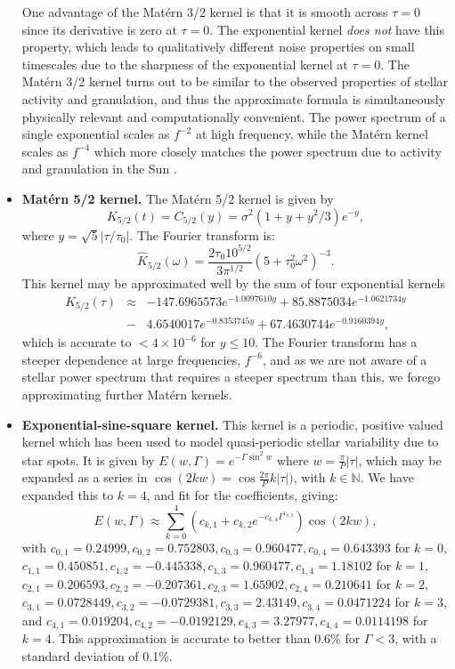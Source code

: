 \documentclass[manuscript, letterpaper]{aastex6}
\begin{document}
\begin{itemize}
One advantage of the Mat\'ern 3/2 kernel is that it is smooth across
$\tau=0$ since its derivative is zero at $\tau=0$.  The exponential kernel {\it does not}
have this property, which leads to qualitatively different noise properties on small
timescales due to the sharpness of the exponential kernel at $\tau=0$.  The Mat\'ern 3/2 kernel
turns out to be similar to the observed properties of stellar activity and granulation, and thus the approximate
formula is simultaneously physically relevant and computationally convenient.  
The power spectrum of a single exponential scales as $f^{-2}$ at high frequency,
while the Mat\'ern kernel scales as $f^{-4}$ which more closely matches the power
spectrum due to activity and granulation in the Sun \citep{2004A&A...414.1139A,2009A&A...495..979M}.
\item {\bf Mat\'ern 5/2 kernel.}  The Mat\'ern 5/2 kernel is given by
\begin{equation}
K_{5/2}(t) = C_{5/2}(y) = \sigma^2 (1+y+y^2/3)e^{-y},
\end{equation}
where $y = \sqrt{5}\vert \tau/\tau_0\vert$.  The Fourier transform is:
\begin{equation}
\hat K_{5/2}(\omega) = \frac{2\tau_0 10^{5/2}}{3\pi^{1/2}} (5+\tau_0^2\omega^2)^{-3}.
\end{equation}
This kernel may be approximated well by the sum of four exponential kernels
\begin{eqnarray}
K_{5/2}(\tau) &\approx& -147.6965573 e^{-1.0097610 y} + 85.8875034 e^{-1.0621734 y}\\
 &-&4.6540017 e^{-0.8353745 y} + 67.4630744 e^{-0.9160394 y},
\end{eqnarray}
which is accurate to $<4\times 10^{-6}$ for $y \le 10$.
The Fourier transform has a steeper dependence at large frequencies, $f^{-6}$, and as we are not aware of a stellar
power spectrum that requires a steeper spectrum than this, we forego approximating further Mat\'ern kernels.
\item {\bf Exponential-sine-square kernel.}  This kernel is a periodic, positive valued kernel
which has been used to model quasi-periodic stellar variability due to star spots.   It is
given by $E(w,\Gamma) = e^{-\Gamma \sin^2{w}}$ where $w = \frac{\pi}{P}\vert \tau \vert$, which may be 
expanded as a series in $\cos{(2kw)} = \cos{\frac{2\pi}{P} k \vert \tau \vert)}$,
with $k \in \mathbb{N}$.  We have expanded this to $k=4$, and fit for the coefficients, giving:  
\begin{equation}
E(w,\Gamma) \approx \sum_{k=0}^4 \left(c_{k,1}+c_{k,2} e^{-c_{k,4}\Gamma^{c_{k,3}}}\right) \cos{(2kw)},
\end{equation}
with $c_{0,1}=0.24999, c_{0,2}=0.752803, c_{0,3}=0.960477, c_{0,4}=0.643393$ for $k=0$,
$c_{1,1}=0.450851, c_{1,2}=-0.445338, c_{1,3}=0.960477, c_{1,4}= 1.18102$ for $k=1$,
$c_{2,1}=0.206593, c_{2,2}=-0.207361, c_{2,3}=1.65902, c_{2,4}= 0.210641$ for $k=2$,
$c_{3,1}=0.0728449, c_{3,2}=-0.0729381, c_{3,3}=2.43149, c_{3,4}= 0.0471224$ for $k=3$, and
$c_{4,1}=0.019204, c_{4,2}=-0.0192129, c_{4,3}=3.27977, c_{4,4}= 0.0114198$ for $k=4$.
This approximation is accurate to better than 0.6\% for $\Gamma < 3$, with a standard
deviation of 0.1\%.
\end{itemize}
\end{document}

